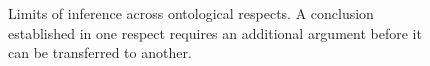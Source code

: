 \begin{figure}[htbp]
\begin{tikzpicture}
    \end{tikzpicture}

    \caption{Limits of inference across ontological respects. A conclusion
    established in one respect requires an additional argument
    before it can be transferred to another.}
    \label{fig:limits-of-inference-across-ontological-respects}
\end{figure}


